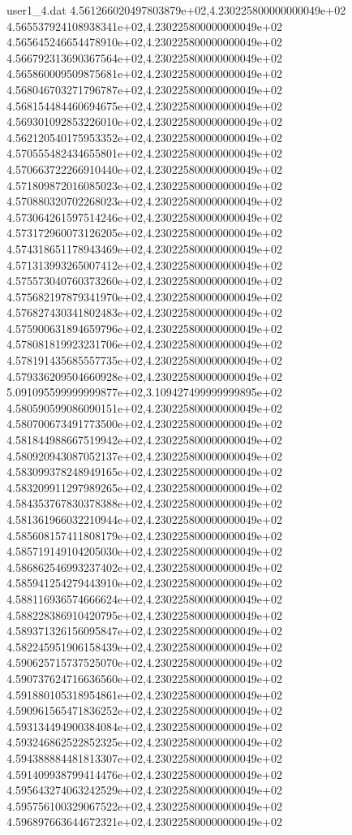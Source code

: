 \begin{filecontents}{user1_4.dat}
4.561266020497803879e+02,4.230225800000000049e+02
4.565537924108938341e+02,4.230225800000000049e+02
4.565645246654478910e+02,4.230225800000000049e+02
4.566792313690367564e+02,4.230225800000000049e+02
4.565860009509875681e+02,4.230225800000000049e+02
4.568046703271796787e+02,4.230225800000000049e+02
4.568154484460694675e+02,4.230225800000000049e+02
4.569301092853226010e+02,4.230225800000000049e+02
4.562120540175953352e+02,4.230225800000000049e+02
4.570555482434655801e+02,4.230225800000000049e+02
4.570663722266910440e+02,4.230225800000000049e+02
4.571809872016085023e+02,4.230225800000000049e+02
4.570880320702268023e+02,4.230225800000000049e+02
4.573064261597514246e+02,4.230225800000000049e+02
4.573172960073126205e+02,4.230225800000000049e+02
4.574318651178943469e+02,4.230225800000000049e+02
4.571313993265007412e+02,4.230225800000000049e+02
4.575573040760373260e+02,4.230225800000000049e+02
4.575682197879341970e+02,4.230225800000000049e+02
4.576827430341802483e+02,4.230225800000000049e+02
4.575900631894659796e+02,4.230225800000000049e+02
4.578081819923231706e+02,4.230225800000000049e+02
4.578191435685557735e+02,4.230225800000000049e+02
4.579336209504660928e+02,4.230225800000000049e+02
5.091095599999999877e+02,3.109427499999999895e+02
4.580590599086090151e+02,4.230225800000000049e+02
4.580700673491773500e+02,4.230225800000000049e+02
4.581844988667519942e+02,4.230225800000000049e+02
4.580920943087052137e+02,4.230225800000000049e+02
4.583099378248949165e+02,4.230225800000000049e+02
4.583209911297989265e+02,4.230225800000000049e+02
4.584353767830378388e+02,4.230225800000000049e+02
4.581361966032210944e+02,4.230225800000000049e+02
4.585608157411808179e+02,4.230225800000000049e+02
4.585719149104205030e+02,4.230225800000000049e+02
4.586862546993237402e+02,4.230225800000000049e+02
4.585941254279443910e+02,4.230225800000000049e+02
4.588116936574666624e+02,4.230225800000000049e+02
4.588228386910420795e+02,4.230225800000000049e+02
4.589371326156095847e+02,4.230225800000000049e+02
4.582245951906158439e+02,4.230225800000000049e+02
4.590625715737525070e+02,4.230225800000000049e+02
4.590737624716636560e+02,4.230225800000000049e+02
4.591880105318954861e+02,4.230225800000000049e+02
4.590961565471836252e+02,4.230225800000000049e+02
4.593134494900384084e+02,4.230225800000000049e+02
4.593246862522852325e+02,4.230225800000000049e+02
4.594388884481813307e+02,4.230225800000000049e+02
4.591409938799414476e+02,4.230225800000000049e+02
4.595643274063242529e+02,4.230225800000000049e+02
4.595756100329067522e+02,4.230225800000000049e+02
4.596897663644672321e+02,4.230225800000000049e+02

\end{filecontents}
